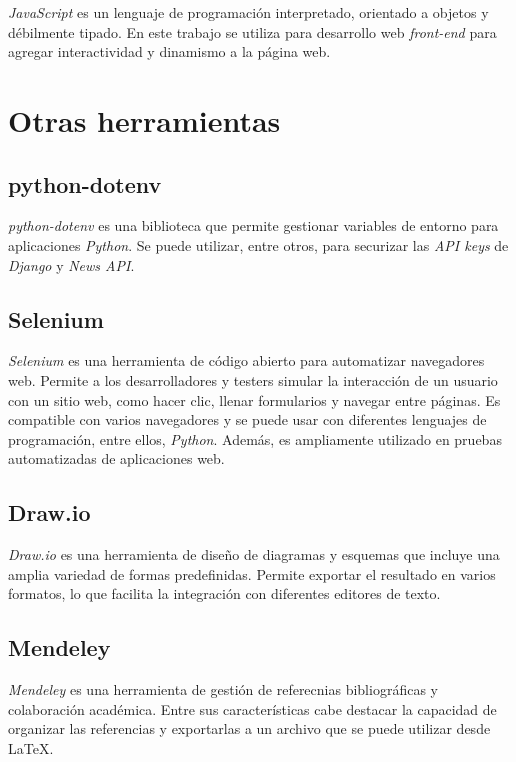 \emph{JavaScript} \citep{wiki:javascript} es un lenguaje de programación interpretado, orientado a objetos y débilmente tipado. En este trabajo se utiliza para desarrollo web \emph{front-end} para agregar 
interactividad y dinamismo a la página web. 


\section{Otras herramientas}\label{otras_herramientas}

\subsection{python-dotenv}\label{python-dotenv}

\emph{python-dotenv} \citep{online:dotenv} es una biblioteca que permite gestionar variables de entorno para aplicaciones \emph{Python}. Se puede utilizar, entre otros, para securizar las \emph{API keys} de \emph{Django} y \emph{News API}. 

\subsection{Selenium}\label{selenium}

\emph{Selenium} \citep{online:selenium} es una herramienta de código abierto para automatizar navegadores web. Permite a los desarrolladores y testers simular la interacción de un usuario con un sitio web, como hacer clic, llenar formularios y navegar entre páginas. Es compatible con varios navegadores y se puede usar con diferentes lenguajes de programación, entre ellos, \emph{Python}. Además, es ampliamente utilizado en pruebas automatizadas de aplicaciones web.

\subsection{Draw.io}\label{draw_io}

\emph{Draw.io} \citep{online:drawio} es una herramienta de diseño de diagramas y esquemas que incluye una amplia variedad de formas predefinidas. Permite exportar el resultado en varios formatos, lo que facilita la integración con diferentes editores de texto. 

\subsection{Mendeley}\label{mendeley}

\emph{Mendeley} \citep{online:mendeley} es una herramienta de gestión de referecnias bibliográficas y colaboración académica. Entre sus características cabe destacar la capacidad de organizar las referencias y exportarlas a un archivo que se puede utilizar desde \LaTeX. 
